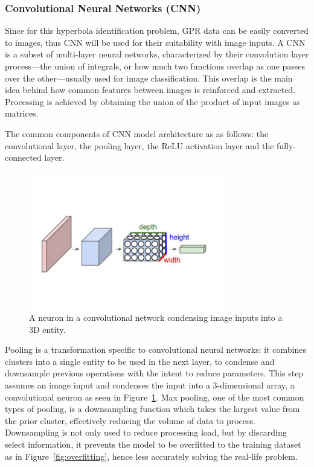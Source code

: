 \documentclass[se,blockletter]{uw-wkrpt}
\begin{document}
\subsubsection{Convolutional Neural Networks (CNN)}
Since for this hyperbola identification problem, GPR data can be easily converted to images, thus CNN will be used for their suitability with image inputs. A CNN is a subset of multi-layer neural networks, characterized by their convolution layer process---the union of integrals, or how much two functions overlap as one passes over the other---usually used for image classification. This overlap is the main idea behind how common features between images is reinforced and extracted. Processing is achieved by obtaining the union of the product of input images as matrices. \autocite[3]{cs231n_cnn}

The common components of CNN model architecture as as follows: the convolutional layer, the pooling layer, the ReLU activation layer and the fully-connected layer.

\begin{figure}
  \centering
  \includegraphics[height=6cm]{convolutional-neuron}
  \caption{A neuron in a convolutional network condensing image inputs into a 3D entity.~\cite{ref:}}
  \label{fig:cnn-neuron}
\end{figure}

Pooling is a transformation specific to convolutional neural networks: it combines clusters into a single entity to be used in the next layer, to condense and downsample previous operations with the intent to reduce parameters. This step assumes an image input and condenses the input into a 3-dimensional array, a convolutional neuron as seen in Figure~\ref{fig:cnn-neuron}. Max pooling, one of the most common types of pooling, is a downsampling function which takes the largest value from the prior cluster, effectively reducing the volume of data to process. Downsampling is not only used to reduce processing load, but by discarding select information, it prevents the model to be overfitted to the training dataset as in Figure~\ref{fig:overfitting}, hence less accurately solving the real-life problem. 
\end{document}
